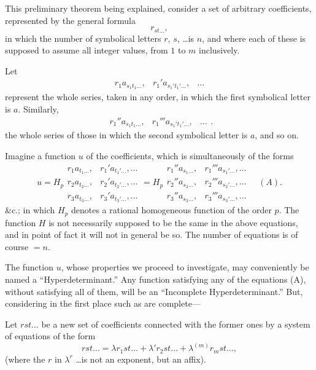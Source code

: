 \documentclass[11pt,a4paper]{article}
\theoremstyle{plain}
\theoremstyle{definition}
\theoremstyle{remark}
\begin{document}
This preliminary theorem being explained, consider a set of arbitrary coefficients,
represented by the general formula
\[
r_{st\ldots}
\tag{6},
\]
in which the number of symbolical letters $r$, $s$, \ldots is $n$, and where each of these is
supposed to assume all integer values, from $1$ to $m$ inclusively.

\newpage
Let
\[
\begin{array}{ccc}
r_1 a_{s_1 t_1 \ldots}, & r_1' a_{s_1' t_1' \ldots}, & \ldots
\end{array}
\tag{7}
\]
represent the whole series, taken in any order, in which the first symbolical letter
is $a$. Similarly,
\[
\begin{array}{ccc}
r_1'' a_{s_1 t_1 \ldots}, & r_1''' a_{s_1' t_1' \ldots}, & \ldots
\end{array}
\tag{8}.
\]
the whole series of those in which the second symbolical letter is $a$, and so on.

Imagine a function $u$ of the coefficients, which is simultaneously of the forms
\[
u = H_p
\begin{array}{cc}
r_1 a_{t_1 \ldots}, & r_1' a_{t_1' \ldots}, \ldots \\
r_2 a_{t_2 \ldots}, & r_2' a_{t_2' \ldots}, \ldots \\
r_3 a_{t_3 \ldots}, & r_3' a_{t_3' \ldots}, \ldots
\end{array}
= H_p
\begin{array}{cc}
r_1'' a_{s_1 \ldots}, & r_1''' a_{s_1' \ldots}, \ldots \\
r_2'' a_{s_2 \ldots}, & r_2''' a_{s_2' \ldots}, \ldots \\
r_3'' a_{s_3 \ldots}, & r_3''' a_{s_3' \ldots}, \ldots
\end{array}
\quad (A).
\]
\&c.; in which $H_p$ denotes a rational homogeneous function of the order $p$. The
function $H$ is not necessarily supposed to be the same in the above equations, and
in point of fact it will not in general be so. The number of equations is of course $=n$.

The function $u$, whose properties we proceed to investigate, may conveniently be
named a ``Hyperdeterminant.'' Any function satisfying any of the equations (A),
without satisfying all of them, will be an ``Incomplete Hyperdeterminant.'' But,
considering in the first place such as are complete---

Let $rst\ldots$ be a new set of coefficients connected with the former ones by a system
of equations of the form
\[
rst\ldots = \lambda r_1 st\ldots + \lambda' r_2 st\ldots + \lambda^{(m)} r_m st\ldots
\tag{9},
\]
(where the $r$ in $\lambda^r$ \ldots is not an exponent, but an affix).
\end{document}
